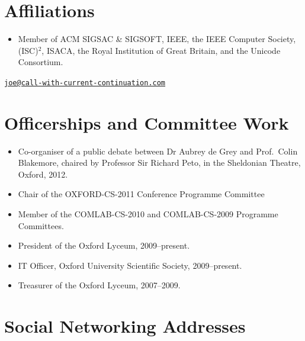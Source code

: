 \documentclass[12pt,twoside,letterpaper]{article}
\begin{document}
\vspace{-7mm}
\section*{Affiliations}
\vspace{-2mm}

\begin{itemize}
    \item Member of ACM SIGSAC \& SIGSOFT, IEEE, the IEEE Computer Society,
        (ISC)$^2$, ISACA, the Royal Institution of Great Britain, and the
        Unicode Consortium.
\end{itemize}

\noindent


\newpage


\vspace*{-23mm}\hfill\href{mailto:joe@call-with-current-continuation.com}%
{\nolinkurl{joe@call-with-current-continuation.com}}

\vspace{-3mm}
\section*{Officerships and Committee Work}
\vspace{-2mm}

\begin{itemize}
	\item Co-organiser of a public debate between Dr Aubrey de Grey
		and Prof.\ Colin Blakemore, chaired by Professor Sir Richard
		Peto, in the Sheldonian Theatre, Oxford, 2012.
	\item Chair of the OXFORD-CS-2011 Conference Programme Committee
	\item Member of the COMLAB-CS-2010 and COMLAB-CS-2009 Programme
		Committees.
	\item President of the Oxford Lyceum, 2009--present.
	\item IT Officer, Oxford University Scientific Society, 2009--present.
	\item Treasurer of the Oxford Lyceum, 2007--2009.
\end{itemize}


\vspace{-8mm}
\section*{Social Networking Addresses}
\end{document}
